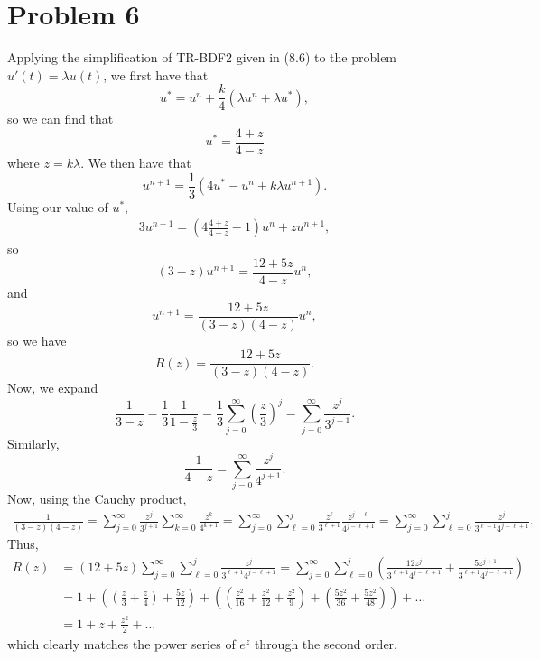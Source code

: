 \documentclass{article}
\begin{document}
\section{Problem 6}
Applying the simplification of TR-BDF2 given in (8.6) to the problem $u'(t) = \lambda u(t)$, we first have that 
\[
u^*=u^n+\frac{k}{4}(\lambda u^n+\lambda u^*),
\]
so we can find that
\[
u^*=\frac{4+z}{4-z}
\]
where $z=k\lambda$. We then have that
\[
u^{n+1}=\frac{1}{3}(4u^*-u^n+k\lambda u^{n+1}).
\]
Using our value of $u^*$, 
\begin{align*}
3u^{n+1}=\left(4\frac{4+z}{4-z}-1\right)u^n+zu^{n+1},
\end{align*}
so 
\[
(3-z)u^{n+1}=\frac{12+5z}{4-z}u^n,
\]
and 
\[
u^{n+1}=\frac{12+5z}{(3-z)(4-z)}u^n,
\]
so we have 
\[
R(z)=\frac{12+5z}{(3-z)(4-z)}.
\]
Now, we expand
\[
\frac{1}{3-z}=\frac{1}{3}\frac{1}{1-\frac{z}{3}}=\frac{1}{3}\sum_{j=0}^{\infty}\left(\frac{z}{3}\right)^j=\sum_{j=0}^{\infty}\frac{z^j}{3^{j+1}}.
\]
Similarly, 
\[
\frac{1}{4-z}=\sum_{j=0}^{\infty}\frac{z^j}{4^{j+1}}.
\]
Now, using the Cauchy product,
\begin{align*}
\frac{1}{(3-z)(4-z)}=\sum_{j=0}^{\infty}\frac{z^j}{3^{j+1}}\sum_{k=0}^{\infty}\frac{z^k}{4^{k+1}}=\sum_{j=0}^{\infty}\sum_{\ell=0}^j\frac{z^\ell}{3^{\ell+1}}\frac{z^{j-\ell}}{4^{j-\ell+1}}=\sum_{j=0}^{\infty}\sum_{\ell=0}^j\frac{z^j}{3^{\ell+1}4^{j-\ell+1}}.
\end{align*}
Thus,
\begin{align*}
R(z)&=(12+5z)\sum_{j=0}^{\infty}\sum_{\ell=0}^j\frac{z^j}{3^{\ell+1}4^{j-\ell+1}}=\sum_{j=0}^{\infty}\sum_{\ell=0}^j\left(\frac{12z^j}{3^{\ell+1}4^{j-\ell+1}}+\frac{5z^{j+1}}{3^{\ell+1}4^{j-\ell+1}}\right)\\&=
1+\left(\left(\frac{z}{3}+\frac{z}{4}\right)+\frac{5z}{12}\right)+\left(\left(\frac{z^2}{16}+\frac{z^2}{12}+\frac{z^2}{9}\right)+\left(\frac{5z^2}{36}+\frac{5z^2}{48}\right)\right)+\ldots\\&=
1+z+\frac{z^2}{2}+\ldots
\end{align*}
which clearly matches the power series of $e^z$ through the second order.
\end{document}
